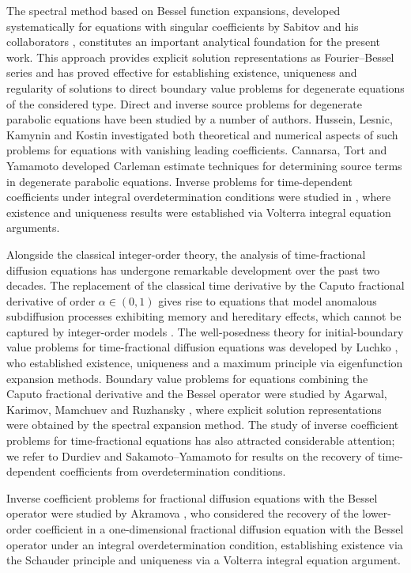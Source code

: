 \documentclass[reqno]{amsart}
\theoremstyle{definition}
\numberwithin{equation}{section}
\begin{document}
The spectral method based on Bessel function expansions, developed systematically for
equations with singular coefficients by Sabitov and his collaborators \cite{Sabitov,Vagapova},
constitutes an important analytical foundation for the present work. This approach
provides explicit solution representations as Fourier--Bessel series and has proved
effective for establishing existence, uniqueness and regularity of solutions to direct
boundary value problems for degenerate equations of the considered type. Direct and
inverse source problems for degenerate parabolic equations have been studied by a number
of authors. Hussein, Lesnic, Kamynin and Kostin \cite{A1} investigated both theoretical
and numerical aspects of such problems for equations with vanishing leading coefficients.
Cannarsa, Tort and Yamamoto \cite{A2} developed Carleman estimate techniques for
determining source terms in degenerate parabolic equations. Inverse problems for
time-dependent coefficients under integral overdetermination conditions were studied
in \cite{A3,A4}, where existence and uniqueness results were established via Volterra
integral equation arguments.
 
Alongside the classical integer-order theory, the analysis of time-fractional diffusion
equations has undergone remarkable development over the past two decades. The replacement
of the classical time derivative by the Caputo fractional derivative of order
$\alpha\in(0,1)$ gives rise to equations that model anomalous subdiffusion processes
exhibiting memory and hereditary effects, which cannot be captured by integer-order
models \cite{Podlubny}. The well-posedness theory for initial-boundary value problems for
time-fractional diffusion equations was developed by Luchko \cite{A5}, who established
existence, uniqueness and a maximum principle via eigenfunction expansion methods.
Boundary value problems for equations combining the Caputo fractional derivative and
the Bessel operator were studied by Agarwal, Karimov, Mamchuev and Ruzhansky \cite{A6},
where explicit solution representations were obtained by the spectral expansion method.
The study of inverse coefficient problems for time-fractional equations has also attracted
considerable attention; we refer to Durdiev \cite{A7} and Sakamoto--Yamamoto \cite{A8}
for results on the recovery of time-dependent coefficients from overdetermination
conditions.

 Inverse coefficient problems for fractional diffusion equations with the Bessel operator were studied by Akramova \cite{Akramova}, who considered the recovery of the lower-order coefficient in a one-dimensional fractional diffusion equation with the Bessel operator under an integral overdetermination condition, establishing existence via the Schauder principle and uniqueness via a Volterra integral equation argument.
 
\end{document}
